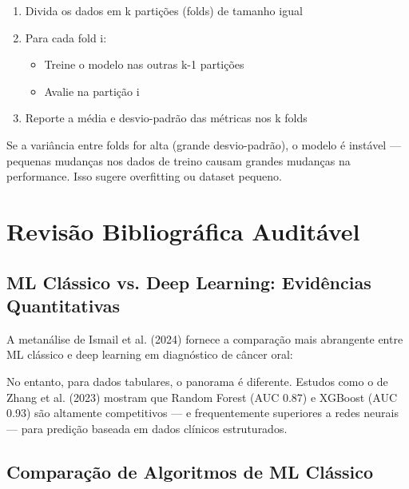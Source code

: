 \begin{enumerate}
    \item Divida os dados em k partições (folds) de tamanho igual
    \item Para cada fold i:
    \begin{itemize}
        \item Treine o modelo nas outras k-1 partições
        \item Avalie na partição i
    \end{itemize}
    \item Reporte a média e desvio-padrão das métricas nos k folds
\end{enumerate}

Se a variância entre folds for alta (grande desvio-padrão), o modelo é instável — pequenas mudanças nos dados de treino causam grandes mudanças na performance. Isso sugere overfitting ou dataset pequeno.

\section{Revisão Bibliográfica Auditável}

\subsection{ML Clássico vs. Deep Learning: Evidências Quantitativas}

A metanálise de Ismail et al. (2024) \cite{ODT-023} fornece a comparação mais abrangente entre ML clássico e deep learning em diagnóstico de câncer oral:


No entanto, para dados tabulares, o panorama é diferente. Estudos como o de Zhang et al. (2023) \cite{ODT-025} mostram que Random Forest (AUC 0.87) e XGBoost (AUC 0.93) são altamente competitivos — e frequentemente superiores a redes neurais — para predição baseada em dados clínicos estruturados.

\subsection{Comparação de Algoritmos de ML Clássico}

